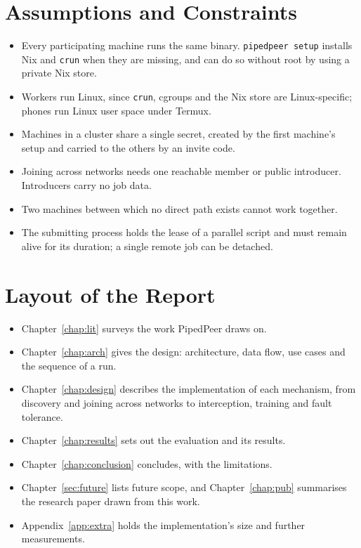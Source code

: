 \section{Assumptions and Constraints}

\begin{itemize}[leftmargin=*]
  \item Every participating machine runs the same binary.
  \texttt{pipedpeer setup} installs Nix and \texttt{crun} when they are missing,
  and can do so without root by using a private Nix store.
  \item Workers run Linux, since \texttt{crun}, cgroups and the Nix store are
  Linux-specific; phones run Linux user space under Termux.
  \item Machines in a cluster share a single secret, created by the first machine's
  setup and carried to the others by an invite code.
  \item Joining across networks needs one reachable member or public
  introducer. Introducers carry no job data.
  \item Two machines between which no direct path exists cannot work together.
  \item The submitting process holds the lease of a parallel script and must
  remain alive for its duration; a single remote job can be detached.
\end{itemize}

\section{Layout of the Report}

\begin{itemize}[leftmargin=*]
  \item Chapter~\ref{chap:lit} surveys the work PipedPeer draws on.
  \item Chapter~\ref{chap:arch} gives the design: architecture, data flow, use
  cases and the sequence of a run.
  \item Chapter~\ref{chap:design} describes the implementation of each
  mechanism, from discovery and joining across networks to interception,
  training and fault tolerance.
  \item Chapter~\ref{chap:results} sets out the evaluation and its results.
  \item Chapter~\ref{chap:conclusion} concludes, with the limitations.
  \item Chapter~\ref{sec:future} lists future scope, and
  Chapter~\ref{chap:pub} summarises the research paper drawn from this work.
  \item Appendix~\ref{app:extra} holds the implementation's size and further
  measurements.
\end{itemize}
